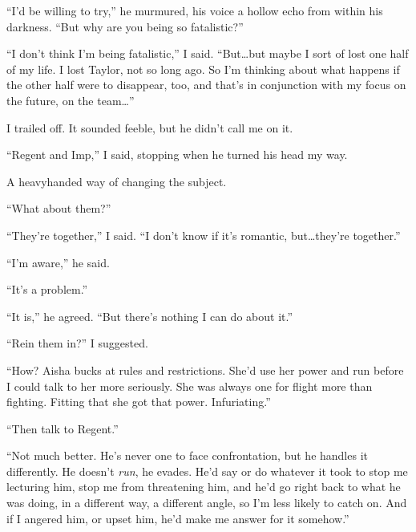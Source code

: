 ``I'd be willing to try,'' he murmured, his voice a hollow echo from within his darkness.   ``But why are you being so fatalistic?''



``I don't think I'm being fatalistic,'' I said.  ``But\ldots but maybe I sort of lost one half of my life.  I lost Taylor, not so long ago.  So I'm thinking about what happens if the other half were to disappear, too, and that's in conjunction with my focus on the future, on the team\ldots''



I trailed off.  It sounded feeble, but he didn't call me on it.



``Regent and Imp,'' I said, stopping when he turned his head my way.



A heavyhanded way of changing the subject.



``What about them?''



``They're together,'' I said.  ``I don't know if it's romantic, but\ldots they're together.''



``I'm aware,'' he said.



``It's a problem.''



``It is,'' he agreed.  ``But there's nothing I can do about it.''



``Rein them in?''  I suggested.



``How?  Aisha bucks at rules and restrictions.  She'd use her power and run before I could talk to her more seriously.  She was always one for flight more than fighting.  Fitting that she got that power.  Infuriating.''



``Then talk to Regent.''



``Not much better.  He's never one to face confrontation, but he handles it differently.  He doesn't \emph{run}, he evades.  He'd say or do whatever it took to stop me lecturing him, stop me from threatening him, and he'd go right back to what he was doing, in a different way, a different angle, so I'm less likely to catch on.  And if I angered him, or upset him, he'd make me answer for it somehow.''



